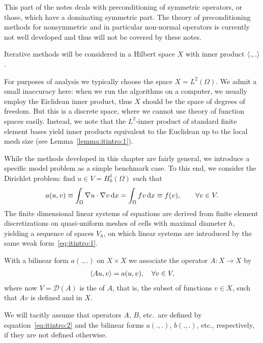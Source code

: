 
\begin{remark}
  This part of the notes deals with preconditioning of symmetric
  operators, or those, which have a dominating symmetric part. The
  theory of preconditioning methods for nonsymmetric and in particular
  non-normal operators is currently not well developed and thus will not
  be covered by these notes. 
\end{remark}

\begin{notation}
  Iterative methods will be considered in a Hilbert space $X$ with
  inner product $\scal(.,.)$.
\end{notation}

\begin{remark}
  For purposes of analysis we typically choose the space $X =
  L^2(\Omega)$. We admit a small inaccuracy here: when we run the
  algorithms on a computer, we usually employ the Eiclidean inner
  product, thus $X$ should be the space of degrees of freedom. But
  this is a discrete space, where we cannot use theory of function
  spaces easily. Instead, we note that the $L^2$-inner product of
  standard finite element bases yield inner products equivalent to the
  Euclidean up to the local mesh size (see Lemma~\ref{lemma:itintro:1}).
\end{remark}

\begin{example}
  While the methods developed in this chapter are fairly general, we
  introduce a specific model problem as a simple benchmark case. To
  this end, we consider the Dirichlet problem: find $u\in V =
  H^1_0(\Omega)$ such that
  \begin{gather}
    \label{eq:itintro:1}
    a(u,v) \equiv \int_\Omega \nabla u\cdot \nabla v \,\mathrm{d} x
    = \int_\Omega f v \,\mathrm{d} x \equiv f(v),
    \qquad \forall v\in V.
  \end{gather}
  The finite dimensional linear systems of equations are derived from
  finite element discretizations on quasi-uniform meshes of cells with
  maximal diameter $h$, yielding a sequence of spaces $V_h$, on which
  linear systems are introduced by the same weak
  form~\eqref{eq:itintro:1}.
\end{example}

\begin{notation}
  With a bilinear form $a(.,.)$ on $X\times X$ we associate the
  operator $A: X\to X$ by
  \begin{gather}
    \label{eq:itintro:2}
    \scal(Au,v) = a(u,v), \quad \forall v\in V,
  \end{gather}
  where now $V = \mathcal D(A)$ is the  of $A$, that is, the
  subset of functions $v\in X$, such that $Av$ is defined and in $X$.
  
  We will tacitly assume that operators $A$, $B$, etc.\ are defined by
  equation~\eqref{eq:itintro:2} and the bilinear forms $a(.,.)$,
  $b(.,.)$, etc., respectively, if they are not defined otherwise.
\end{notation}

